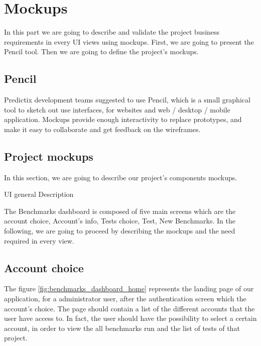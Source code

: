 

\section{Mockups}
In this part we are going to describe and validate the project business
requirements in every UI views using mockups. First, we are going to present the
Pencil tool. Then we are going to define the project's mockups.

\subsection{Pencil}
Predictix development teams suggested to use Pencil, which is a small graphical
tool to sketch out use interfaces, for websites and web / desktop / mobile
application. Mockups provide enough interactivity to replace prototypes, and
make it easy to collaborate and get feedback on the wireframes.

\subsection{Project mockups}
In this section, we are going to describe our project's components mockups.

UI general Description

The Benchmarks dashboard is composed of five main screens which are the account
choice, Account's info, Tests choice, Test, New Benchmarks. In the following,
we are going to proceed by describing the mockups and the need required in every
view.

\subsection{Account choice}
The figure
\hyperref[fig:benchmarks_dashboard_home]{\ref{fig:benchmarks_dashboard_home}}
represents the landing page of our application, for a administrator user,
after the authentication screen which the account's choice. The page should
contain a list of the different accounts that the user have access to. In fact,
the user should have the possibility to select a certain account, in order to
view the all benchmarks run and the list of tests of that project.

